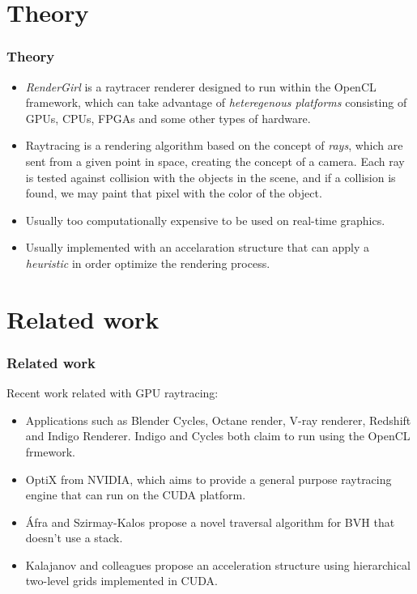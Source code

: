 \documentclass{beamer}
\begin{document}
\section{Theory}
\begin{frame}
\frametitle{Theory}

\begin{itemize}

\item \emph{RenderGirl} is a raytracer renderer designed to run within the
OpenCL framework, which can take advantage of \emph{heteregenous
  platforms} consisting of GPUs, CPUs, FPGAs and some other types of
hardware.

\item Raytracing is a rendering algorithm based on the concept of
\emph{rays}, which are sent from a given point in space, creating the
concept of a camera. Each ray is tested against collision with the
objects in the scene, and if a collision is found, we may paint that
pixel with the color of the object.

\item Usually too computationally expensive to be used on real-time
  graphics.

\item Usually implemented with an accelaration structure that can
  apply a \emph{heuristic} in order optimize the rendering process.

\end{itemize}

\end{frame}



\section{Related work}
\begin{frame}
\frametitle{Related work}

Recent work related with GPU raytracing:

\begin{itemize}

\item Applications such as Blender Cycles, Octane render, V-ray
  renderer, Redshift and Indigo Renderer. Indigo and Cycles both claim
  to run using the OpenCL frmework.

\item OptiX from NVIDIA, which aims to provide a general purpose
  raytracing engine that can run on the CUDA platform.

\item Áfra and Szirmay-Kalos propose a novel traversal algorithm for
  BVH that doesn't use a stack\cite{Afra}.

\item Kalajanov and colleagues propose an acceleration structure using
  hierarchical two-level grids implemented in CUDA\cite{Kalojanov}.

\end{itemize}

\end{frame}
\end{document}
